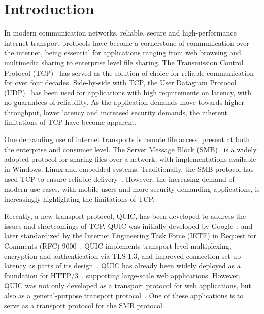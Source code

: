 \documentclass[english, 12pt, a4paper, elec, utf8, a-2b, online]{aaltothesis}
\begin{document}
\section{Introduction}
\label{sec:intro}

\thispagestyle{empty}

In modern communication networks, reliable, secure and high-performance internet
transport protocols have become a cornerstone of communication over the internet,
being essential for applications ranging from web browsing and multimedia sharing
to enterprise level file sharing. The Transmission Control Protocol (TCP)~\cite{rfc793}
has served as the solution of choice for reliable communication for over four decades.
Side-by-side with TCP, the User Datagram Protocol (UDP)~\cite{rfc768} has been
used for applications with high requirements on latency, with no guarantees of
reliability. As the application demands move towards higher throughput, lower latency
and increased security demands, the inherent limitations of TCP have become apparent.

One demanding use of internet transports is remote file access, present at both
the enterprise and consumer level. The Server Message Block (SMB)~\cite{smb2} is a
widely adopted protocol for sharing files over a network, with implementations available
in Windows, Linux and embedded systems. Traditionally, the SMB protocol has used
TCP to ensure reliable delivery~\cite{smb2}. However, the increasing demand of modern
use cases, with mobile users and more security demanding applications, is increasingly
highlighting the limitations of TCP.

Recently, a new transport protocol, QUIC, has been developed to address
the issues and shortcomings of TCP. QUIC was initially developed by Google~\cite{quic_transport_protocol_design},
and later standardized by the Internet Engineering Task Force (IETF) in Request for Comments (RFC) 9000~\cite{rfc9000}.
QUIC implements transport level multiplexing, encryption and authentication via TLS 1.3, and improved connection
set up latency as parts of its design~\cite{rfc9000,rfc9001}. QUIC has already been
widely deployed as a foundation for HTTP/3~\cite{rfc9114}, supporting large-scale
web applications. However, QUIC was not only developed as a transport protocol for web applications,
but also as a general-purpose transport protocol~\cite{rfc9000}. One of these applications is 
to serve as a transport protocol for the SMB protocol.
\end{document}
